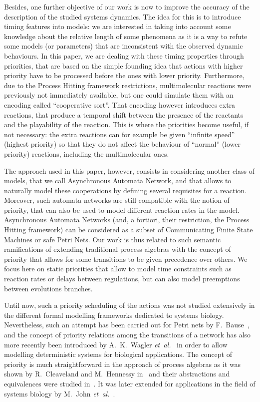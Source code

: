 Besides, one further objective of our work is now %
to improve the accuracy of the description of the studied systems dynamics.
The idea for this is to introduce timing features into models:
we are interested in taking into account some knowledge about the relative length of some phenomena as it is a way to refute some models (or parameters) that are inconsistent with the observed dynamic behaviours.
In this paper, we are dealing with these timing properties through priorities,
that are based on the simple founding idea that actions with higher priority have to be processed before the ones with lower priority.
Furthermore, due to the Process Hitting framework restrictions, multimolecular reactions were previously not immediately available, but one could simulate them with an encoding called “cooperative sort”.
That encoding however introduces extra reactions,
that produce a temporal shift between the presence of the reactants
and the playability of the reaction.
This is where the priorities become useful, if not necessary:
the extra reactions can for example be given “infinite speed” (highest priority) so that they do not affect the behaviour of “normal” (lower priority) reactions, including the multimolecular ones.

The approach used in this paper, however,
consists in considering another class of models,
that we call Asynchronous Automata Network,
and that allows to naturally model these cooperations
by defining several requisites for a reaction.
Moreover, such automata networks are still compatible with the notion of priority,
that can also be used to model different reaction rates in the model.
Asynchronous Automata Networks
(and, a fortiori, their restriction, the Process Hitting framework)
can be considered as a subset of Communicating Finite State Machines
or safe Petri Nets.
Our work is thus related to such semantic ramifications
of extending traditional process algebras with the concept of priority
that allows for some transitions to be given precedence over others.
We focus here on static priorities that allow to model
time constraints such as reaction rates or delays between regulations,
but can also model preemptions between evolutions branches.

Until now, such a priority scheduling of the actions was not studied extensively in the different formal modelling frameworks dedicated to systems biology.
Nevertheless, such an attempt has been carried out for Petri nets by F.~Bause~\cite{Bause97},
and the concept of priority relations among the transitions of a network has also more recently been introduced by A.~K.~Wagler \textit{et~al.}~\cite{waw,WaglerW12} in order to allow modelling deterministic systems for biological applications.
The concept of priority is much straightforward in the approach of process algebras as it was shown by R.~Cleaveland and M.~Hennessy in~\cite{Cleaveland199058,Cleaveland99prioritiesin} and their abstractions and equivalences were studied in~\cite{Cleaveland:2007:PAP:1282576.1282847}.
It was later extended for applications in the field of systems biology by M.~John \textit{et~al.}~\cite{jlnu2010}.

